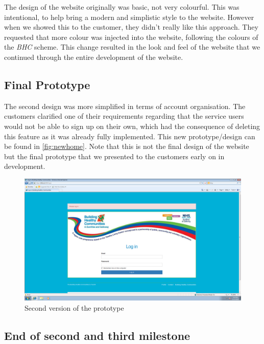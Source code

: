 \documentclass{l3proj}
\begin{document}
The design of the website originally was basic, not very colourful. This was intentional, to help bring a modern and simplistic style to the website. However when we showed this to the customer, they didn't really like this approach. They requested that more colour was injected into the website, following the colours of the \textit{BHC} scheme. This change resulted in the look and feel of the website that we continued through the entire development of the website.

\subsection{Final Prototype}
\label{sec:prototype2}

The second design was more simplified in terms of account organisation. The customers clarified one of their requirements regarding that the service users would not be able to sign up on their own, which had the consequence of deleting this feature as it was already fully implemented. This new prototype/design can be found in \autoref{fig:newhome}. Note that this is not the final design of the website but the final prototype that we presented to the customers early on in development.


\begin{figure}[ht]
\centerline{\includegraphics[width=\textwidth, height=\textheight, keepaspectratio]{newhome.png}}
\caption{Second version of the prototype}
\label{fig:newhome}
\end{figure}

\subsection{End of second and third milestone}
\label{sec:milestone23}
\end{document}
